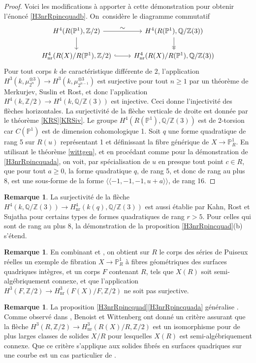 \documentclass[11pt]{article}
\let\ts\textstyle
\theoremstyle{definition}
\newtheorem{rmk}[thm]{Remarque}
\newcommand{\Q}{\mathbb Q}
\newcommand{\Z}{\mathbb Z}
\renewcommand{\P}{\mathbb P}
\newcommand{\on}[1]{\operatorname{#1}}
\begin{document}
\begin{proof}
Voici les modifications à apporter à cette démonstration pour obtenir l'énoncé \eqref{H3nrRpincquadb}. On~considère le diagramme commutatif
\[
\begin{tikzcd}
H^4(R(\P^1),\Z/2) \arrow[r,"\ts \sim"] \arrow[d] & H^4(R(\P^1),\Q/\Z(3)) \arrow[d,->>] \\
H^4_{\on{nr}}(R(X)/R(\P^1),\Z/2) \arrow[r,hook] & H^4_{\on{nr}}(R(X)/R(\P^1),\Q/\Z(3))
\end{tikzcd}
\]
Pour tout corps $k$ de caractéristique différente de $2$, l'application $H^3(k,\mu_{2^n}^{\otimes 3})\to H^3(k,\mu_{2^{n-1}}^{\otimes 3})$ est surjective pour tout $n\geq 1$ par un théorème de Merkurjev, Suslin et Rost,
et donc l'application $H^4(k,\Z/2) \to H^4(k,\Q/\Z(3))$ est injective. Ceci donne l'injectivité des flèches horizontales.
La surjectivité de la flèche verticale de droite est donnée par le théorème \ref{KRS}\eqref{KRSiv}. Le groupe $H^4(R(\P^1),\Q/\Z(3))$ est de 2\nobreakdash-torsion car $C(\P^1)$ est de dimension cohomologique 1. Soit $q$ une forme quadratique de rang 5 sur $R(u)$ représentant 1 et définissant la fibre générique de $X \to \P^1_R$. En utilisant le théorème \ref{wittgen},
et en procédant comme pour la démonstration de \eqref{H3nrRpincquada}, on voit, par spécialisation de $u$ en presque tout point $c\in R$,
que pour tout $a\geq 0$, la forme quadratique
$q$, de rang 5, et donc de rang au plus 8, est une sous-forme de la forme $\langle \!\langle -1,-1,-1, u+a \rangle \!\rangle$, de rang 16.
\end{proof}
\begin{rmk}
La surjectivité de la flèche
$H^{4}(k,\Q/\Z(3)) \to H^{4}_{\on{nr}}(k(q), \Q/\Z(3))$
est aussi établie par Kahn, Rost et Sujatha pour certains types de formes quadratiques de rang $r>5$. Pour celles qui sont de rang au plus 8, la démonstration de la proposition \ref{H3nrRpincquad}(b) s'étend.
\end{rmk}

\begin{rmk}
En combinant \cite[Th.\,1.1]{benoist2026rationality} et \cite[Th.\,4.8]{colliot2024certaines}, on obtient sur $R$ le corps des séries
de Puiseux réelles un
exemple de fibration $X \to \P^1_{R}$ à fibres géométriques des surfaces quadriques intègres,
et un corps $F$ contenant $R$, tels que $X(R)$ soit semi-algébriquement connexe, et que
l'application $H^3(F,\Z/2) \to H^3_{\on{nr}}(F(X)/F,\Z/2)$
ne soit pas surjective.
\end{rmk}

\begin{rmk}
La proposition \ref{H3nrRpincquad}\eqref{H3nrRpincquada} généralise
\cite[Th.\,4.6]{colliot2024certaines}.
Comme observé dans \cite[Rem.\,4.7]{colliot2024certaines},
Benoist et Wittenberg ont donné un critère \cite[Prop.\,5.2]{benoist2020integral1}
assurant que la flèche $H^3(R,\Z/2) \to H^3_{\on{nr}}(R(X)/R,\Z/2)$
est un isomorphisme pour de plus larges classes
de solides $X/R$ pour lesquelles $X(R)$ est semi-algébriquement connexe.
Que ce critère s'applique aux solides fibrés en surfaces quadriques sur
une courbe est un cas particulier de
\cite[Th.\,8.1(i)]{benoist2020integral2}.
\end{rmk}
\end{document}
